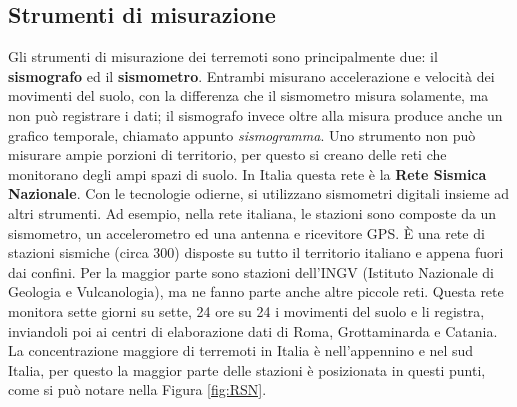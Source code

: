 \documentclass[a4paper,10pt]{memoir}
\begin{document}
\subsection{Strumenti di misurazione}
Gli strumenti di misurazione dei terremoti sono principalmente due: il \textbf{sismografo} ed il \textbf{sismometro}.
Entrambi misurano accelerazione e velocità dei movimenti del suolo, con la differenza che il sismometro misura solamente, ma non può registrare i dati; il sismografo invece oltre alla misura produce anche un grafico temporale, chiamato appunto \textit{sismogramma}.
Uno strumento non può misurare ampie porzioni di territorio, per questo si creano delle reti che monitorano degli ampi spazi di suolo. In Italia questa rete è la \textbf{Rete Sismica Nazionale}.
Con le tecnologie odierne, si utilizzano sismometri digitali insieme ad altri strumenti. Ad esempio, nella rete italiana, le stazioni sono composte da un sismometro, un accelerometro ed una antenna e ricevitore GPS.
È una rete di stazioni sismiche (circa 300) disposte su tutto il territorio italiano e appena fuori dai confini.
Per la maggior parte sono stazioni dell'INGV (Istituto Nazionale di Geologia e Vulcanologia), ma ne fanno parte anche altre piccole reti.
Questa rete monitora sette giorni su sette, 24 ore su 24 i movimenti del suolo e li registra, inviandoli poi ai centri di elaborazione dati di Roma, Grottaminarda e Catania.
La concentrazione maggiore di terremoti in Italia è nell'appennino e nel sud Italia, per questo la maggior parte delle stazioni è posizionata in questi punti, come si può notare nella Figura \ref{fig:RSN}.

\clearpage
\end{document}
